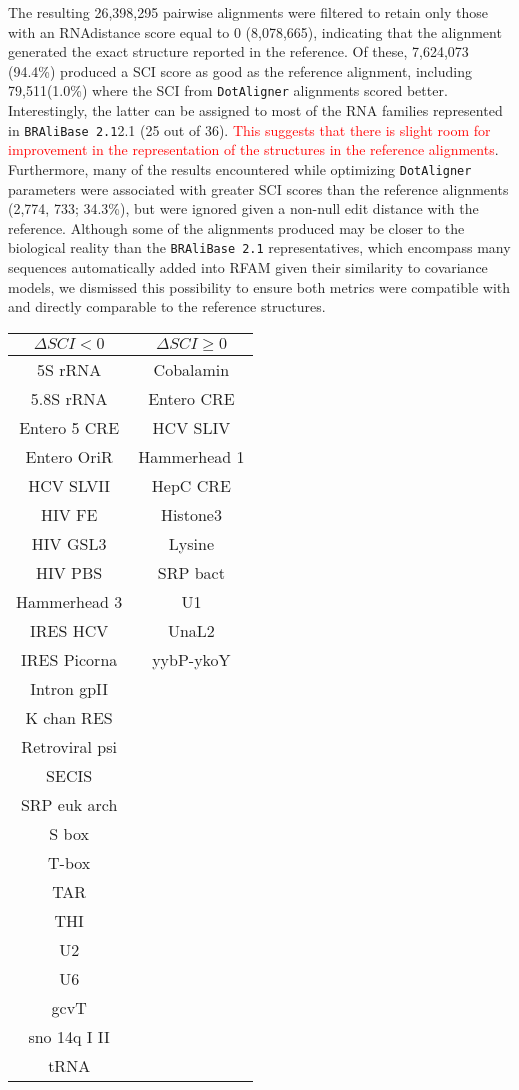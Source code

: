 \documentclass[a4paper,twoside]{article}
\newcommand\dotaligner{\texttt{DotAligner}}
\newcommand\bralibase{\texttt{BRAliBase 2.1}}
\newcommand{\RED}[1]{\textcolor{red}{#1}}
\begin{document}
\noindent The resulting 26,398,295 pairwise alignments were filtered to retain
 only those with an RNAdistance score equal to 0 (8,078,665), indicating that the 
 alignment generated the exact structure reported in the reference.  Of these, 
7,624,073 (94.4\%) produced a SCI score as good as the reference alignment, 
including 79,511(1.0\%) where the SCI from \dotaligner{} alignments scored better. 
Interestingly, the latter can be assigned to most of the RNA families represented 
in \bralibase  2.1 (25 out of 36). \RED{This  suggests that there is slight room for 
improvement in the representation of the structures in the reference alignments}. Furthermore, 
many of the results encountered while optimizing \dotaligner{} parameters were 
associated with greater SCI scores than the reference alignments (2,774, 733; 34.3\%), 
but were ignored given a non-null edit distance with the reference. 
Although some of the alignments produced may be closer to the biological reality 
than the \bralibase{} representatives, which encompass many sequences automatically 
added into RFAM given their similarity to covariance models, we dismissed this 
possibility to ensure both metrics were compatible with and directly comparable 
to the reference structures. 

\begin{tabular}{|c|c|}
\hline 
$\Delta{} SCI < 0$  & $\Delta{} SCI \geq 0$ \\ 
\hline 
5S rRNA & Cobalamin \\
5.8S rRNA & Entero CRE \\
Entero 5 CRE & HCV SLIV \\
Entero OriR & Hammerhead 1 \\
HCV SLVII & HepC CRE \\
HIV FE & Histone3 \\
HIV GSL3 & Lysine\\
HIV PBS & SRP bact \\
Hammerhead 3 & U1 \\
IRES HCV & UnaL2 \\
IRES Picorna & yybP-ykoY \\
Intron gpII & \\
K chan RES & \\
Retroviral psi & \\
SECIS & \\
SRP euk arch & \\
S box & \\
T-box & \\
TAR & \\
THI & \\
U2 & \\
U6 & \\
gcvT & \\
sno 14q I II & \\
tRNA & \\
\hline 
\end{tabular} 
\end{document}
